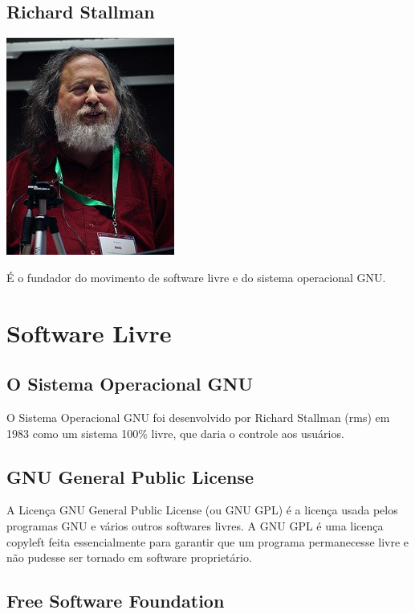 \documentclass[12pt, a4paper]{report}
\begin{document}
\section{Richard Stallman}

\begin{center}
\includegraphics[]{imgs/richard_stallman.jpg}
\end{center}

É o fundador do movimento de software livre e do sistema operacional GNU.

\chapter{Software Livre}

\section{O Sistema Operacional GNU}

O Sistema Operacional GNU foi desenvolvido por Richard Stallman (rms) em 1983 como um sistema 100\% livre, que daria o controle aos usuários.

\section{GNU General Public License}

A Licença GNU General Public License (ou GNU GPL) é a licença usada pelos programas GNU e vários outros softwares livres.
A GNU GPL é uma licença copyleft feita essencialmente para garantir que um programa permanecesse livre e não pudesse ser tornado em software proprietário.

\section{Free Software Foundation}
\end{document}
